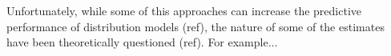 \documentclass[11pt, a4paper]{article}
\begin{document}



Unfortunately, while some of this approaches can increase the predictive performance of distribution models (ref), the nature of some of the estimates have been theoretically questioned (ref). For example...

%
\end{document}
